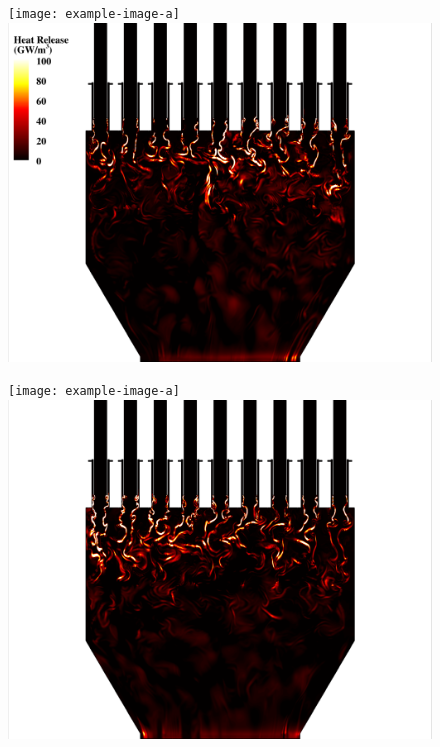 \begin{figure}
	\begin{minipage}{0.49\linewidth}
		\ifdefined\DRAFT
			\texttt{[image: example-image-a]}
		\else
			\includegraphics[width=0.99\linewidth,trim={0.5em 0em 6cm 0em},clip]{Chapters/HPROMResults/Images/nineElem/example_snaps/example_heat_z.png}
		\fi
	\end{minipage}
	\begin{minipage}{0.49\linewidth}
		\ifdefined\DRAFT
			\texttt{[image: example-image-a]}
		\else
			\includegraphics[width=0.99\linewidth,trim={6cm 0em 0.5em 0em},clip]{Chapters/HPROMResults/Images/nineElem/example_snaps/example_heat_z_216000.png}
		\fi
	\end{minipage}


\end{figure}
